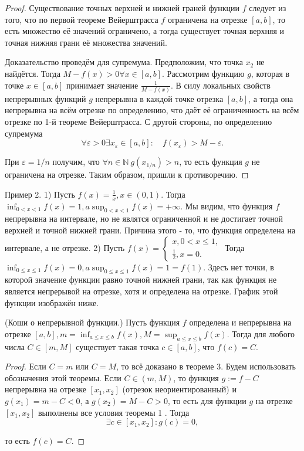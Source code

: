 \begin{proof}
    Существование точных верхней и нижней граней функции $f$ следует из того, что по первой теореме Вейерштрасса $f$ ограничена на отрезке $[a, b]$, то есть множество её значений ограничено, а тогда существует точная верхняя и точная нижняя грани её множества значений.

    Доказательство проведём для супремума. Предположим, что точка $x_2$ не найдётся. Тогда $M-f(x)>0 \forall x \in[a, b]$. Рассмотрим функцию $g$, которая в точке $x \in[a, b]$ принимает значение $\frac{1}{M-f(x)}$. В силу локальных свойств непрерывных функций $g$ непрерывна в каждой точке отрезка $[a, b]$, а тогда она непрерывна на всём отрезке по определению, что даёт её ограниченность на всём отрезке по 1-й теореме Вейерштрасса. С другой стороны, по определению супремума
    $$
        \forall \varepsilon>0 \exists x_{\varepsilon} \in[a, b]: \quad f\left(x_{\varepsilon}\right)>M-\varepsilon .
    $$

    При $\varepsilon=1 / n$ получим, что $\forall n \in \mathbb{N} \: g\left(x_{1 / n}\right)>n$, то есть функция $g$ не ограничена на отрезке. Таким образом, пришли к противоречию.
\end{proof}

Пример 2. 1) Пусть $f(x)=\frac{1}{x}, x \in(0,1)$. Тогда $\inf _{0<x<1} f(x)=1, a \sup _{0<x<1} f(x)=+\infty$. Мы видим, что функция $f$ непрерывна на интервале, но не являтся ограниченной и не достигает точной верхней и точной нижней грани. Причина этого - то, что функция определена на интервале, а не отрезке.
2) Пусть $f(x)=\left\{\begin{array}{l}x, 0<x \leq 1, \\ \frac{1}{2}, x=0 .\end{array}\right.$ Тогда $\inf _{0 \leq x \leq 1} f(x)=0, a \sup _{0 \leq x \leq 1} f(x)=1=f(1)$. Здесъ нет точки, в которой значение функции равно точной нижней грани, так как функция не является непрерывой на отрезке, хотя и определена на отрезке. График этой функции изображён ниже.
\begin{theorem}
    (Коши о непрерывной функции.) Пусть функция $f$ определена и непрерывна на отрезке $[a, b], m=\inf _{a \leq x \leq b} f(x), M=\sup _{a \leq x \leq b} f(x)$. Тогда для любого числа $C \in[m, M]$ существует такая точка $c \in[a, b]$, что $f(c)=C$.
\end{theorem}

\begin{proof}
    Если $C=m$ или $C=M$, то всё доказано в теореме 3. Будем использовать обозначения этой теоремы. Если $C \in(m, M)$, то функция $g:=f-C$ непрерывна на отрезке $\left[x_1, x_2\right]$ (отрезок неориентированный) и $g\left(x_1\right)=m-C<0$, а $g\left(x_2\right)=M-C>0$, то есть для функции $g$ на отрезке $\left[x_1, x_2\right]$ выполнены все условия теоремы 1 . Тогда
    $$
        \exists c \in\left[x_1, x_2\right]: g(c)=0,
    $$

    то есть $f(c)=C$.
\end{proof}

